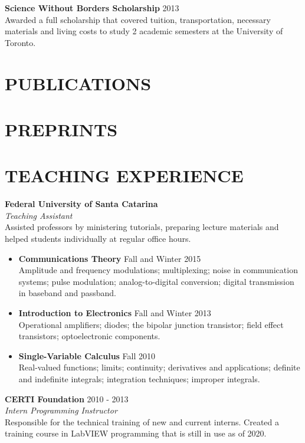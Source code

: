 \documentclass[margin, line]{res}
\begin{document}
\begin{resume}
\textbf{Science Without Borders Scholarship} \hfill 2013\\
Awarded a full scholarship that covered tuition, transportation, necessary materials and living costs to study 2 academic semesters at the University of Toronto.

\section{PUBLICATIONS}
\nocite{*}
\printbibliography[heading=none, keyword=publication]

\section{PREPRINTS}
\printbibliography[heading=none, keyword=preprint]

\newpage
\section{TEACHING EXPERIENCE}
\textbf{Federal University of Santa Catarina}\\
{\sl Teaching Assistant}\\
Assisted professors by ministering tutorials, preparing lecture materials and helped students individually at regular office hours.

\begin{itemize}
    \item \textbf{Communications Theory} \hfill Fall and Winter 2015\\
Amplitude and frequency modulations; multiplexing; noise in communication systems; pulse modulation; analog-to-digital conversion; digital transmission in baseband and passband.
    \item \textbf{Introduction to Electronics} \hfill Fall and Winter 2013\\
Operational amplifiers; diodes; the bipolar junction transistor; field effect transistors; optoelectronic components.
    \item \textbf{Single-Variable Calculus} \hfill Fall 2010\\
Real-valued functions; limits; continuity; derivatives and applications; definite and indefinite integrals; integration techniques; improper integrals.
\end{itemize}

\textbf{CERTI Foundation} \hfill 2010 - 2013\\
{\sl Intern Programming Instructor}\\
Responsible for the technical training of new and current interns. Created a training course in LabVIEW programming that is still in use as of 2020.


\end{resume}
\end{document}
